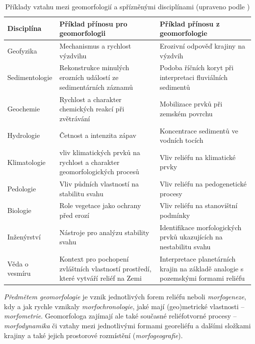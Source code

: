 \begin{table}[h]
	\begin{tabularx}{1\textwidth}{@{}lXX@{}}
		\toprule
		Disciplína   & Příklad přínosu pro geomorfologii                                         & Příklad přínosu z geomorfologie                                    \\ \midrule
		Geofyzika    & Mechanismus a rychlost výzdvihu                                           & Erozivní odpověď krajiny na výzdvih                                \\
		Sedimentologie &
		Rekonstrukce minulých erozních událostí ze sedimentárních záznamů &
		Podoba říčních koryt při interpretaci fluviálních sedimentů \\
		Geochemie    & Rychlost a charakter chemických reakcí při zvětrávání                     & Mobilizace prvků při zemském povrchu                               \\
		Hydrologie   & Četnost a intenzita zápav                                                 & Koncentrace sedimentů ve vodních tocích                            \\
		Klimatologie & vliv klimatických prvků na rychlost a charakter geomorfologických procesů & Vliv reliéfu na klimatické prvky                                   \\
		Pedologie    & Vliv půdních vlastností na stabilitu svahu                                & Vliv reliéfu na pedogenetické procesy                              \\
		Biologie     & Role vegetace jako ochrany před erozí                                     & Vliv reliéfu na stanovištní podmínky                               \\
		Inženýrství  & Nástroje pro analýzu stability svahu                                      & Identifikace morfologických prvků ukazujících na nestabilitu svahu \\
		Věda o vesmíru &
		Kontext pro pochopení zvláštních vlastností prostředí, které vytváří reliéf na Zemi &
		Interpretace planetárních krajin na základě analogie s pozemskými formami reliéfu \\ \bottomrule
	\end{tabularx}
	\caption{Příklady vztahu mezi geomorfologií a spřízněnými disciplínami (upraveno podle \textcite{summerfieldGlobalGeomorphologyIntroduction1999})}
	\label{tab:geom_a_dalsi}
\end{table}

\emph{Předmětem geomorfologie} je vznik jednotlivých forem reliéfu neboli \emph{morfogeneze}, kdy a jak rychle vznikaly \emph{morfochronologie}, jaké mají (geo)metrické vlastnosti -- \emph{morfometrie}. Geomorfologa zajímají ale také současné reliéfotvorné procesy -- \emph{morfodynamika} či vztahy mezi jednotlivými formami georeliéfu a dalšími složkami krajiny a také jejich prostorové rozmístění (\emph{morfogeografie}).

